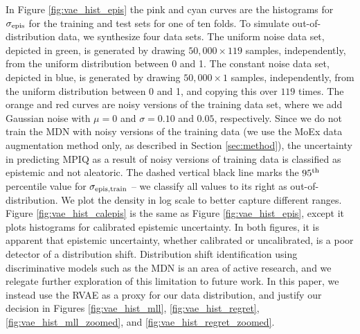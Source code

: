 In Figure \ref{fig:vae_hist_epis} the pink and cyan curves are the histograms for $\sigma_{\rm epis}$ for the training and test sets for one of ten folds. To simulate out-of-distribution data, we synthesize four data sets. The uniform noise data set, depicted in green, is generated by drawing $50,000 \times 119$ samples, independently, from the uniform distribution between 0 and 1. The constant noise data set, depicted in blue, is generated by drawing $50,000 \times 1$ samples, independently, from the uniform distribution between 0 and 1, and copying this over $119$ times. The orange and red curves are noisy versions of the training data set, where we add Gaussian noise with $\mu = 0$ and $\sigma = 0.10$ and $0.05$, respectively. Since we do not train the MDN with noisy versions of the training data (we use the MoEx data augmentation method only, as described in Section \ref{sec:method}), the uncertainty in predicting MPIQ as a result of noisy versions of training data is classified as epistemic and not aleatoric. The dashed vertical black line marks the $95^{\rm th}$ percentile value for $\sigma_{\rm epis, train}$ -- we classify all values to its right as out-of-distribution. We plot the density in log scale to better capture different ranges. Figure \ref{fig:vae_hist_calepis} is the same as Figure \ref{fig:vae_hist_epis}, except it plots histograms for calibrated epistemic uncertainty. In both figures, it is apparent that epistemic uncertainty, whether calibrated or uncalibrated, is a poor detector of a distribution shift. Distribution shift identification using discriminative models such as the MDN is an area of active research, and we relegate further exploration of this limitation to future work. In this paper, we instead use the RVAE as a proxy for our data distribution, and justify our decision in Figures \ref{fig:vae_hist_mll}, \ref{fig:vae_hist_regret}, \ref{fig:vae_hist_mll_zoomed}, and \ref{fig:vae_hist_regret_zoomed}.

